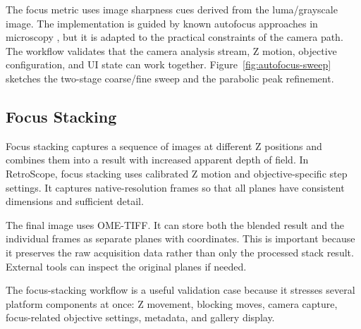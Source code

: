 The focus metric uses image sharpness cues derived from the luma/grayscale image. The implementation is guided by known autofocus approaches in microscopy \cite{pech2000diatom,sun2004autofocusing}, but it is adapted to the practical constraints of the camera path. The workflow validates that the camera analysis stream, Z motion, objective configuration, and UI state can work together. Figure~\ref{fig:autofocus-sweep} sketches the two-stage coarse/fine sweep and the parabolic peak refinement.



\subsection{Focus Stacking}

Focus stacking captures a sequence of images at different Z positions and combines them into a result with increased apparent depth of field. In RetroScope, focus stacking uses calibrated Z motion and objective-specific step settings. It captures native-resolution frames so that all planes have consistent dimensions and sufficient detail.

The final image uses OME-TIFF. It can store both the blended result and the individual frames as separate planes with coordinates. This is important because it preserves the raw acquisition data rather than only the processed stack result. External tools can inspect the original planes if needed.

The focus-stacking workflow is a useful validation case because it stresses several platform components at once: Z movement, blocking moves, camera capture, focus-related objective settings, metadata, and gallery display.

